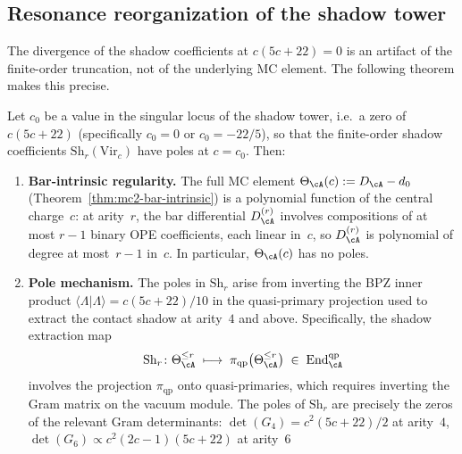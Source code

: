 \subsection{Resonance reorganization of the shadow tower}
\label{subsec:w-resonance-reorganization}

The divergence of the shadow coefficients at $c(5c+22) = 0$ is an
artifact of the finite-order truncation, not of the underlying MC element.
The following theorem makes this precise.

\begin{theorem}
\label{thm:w-resonance-reorganization}
Let $c_0$ be a value in the singular locus of the shadow tower,
i.e.\ a zero of $c(5c+22)$ (specifically $c_0 = 0$ or
$c_0 = -22/5$), so that the finite-order shadow coefficients
$\mathrm{Sh}_r(\mathrm{Vir}_c)$ have poles at $c = c_0$.  Then:
\begin{enumerate}[label=\textup{(\roman*)}]
\item \textbf{Bar-intrinsic regularity.}
  The full MC element $\Theta_\cA(c) := D_\cA - d_0$
  \textup{(}Theorem~\textup{\ref{thm:mc2-bar-intrinsic})} is a
  polynomial function of the central charge~$c$: at arity~$r$,
  the bar differential $D_\cA^{(r)}$ involves compositions of
  at most $r - 1$ binary OPE coefficients, each linear in~$c$,
  so $D_\cA^{(r)}$ is polynomial of degree at most~$r - 1$
  in~$c$.  In particular, $\Theta_\cA(c)$ has no poles.
\item \textbf{Pole mechanism.}
  The poles in $\mathrm{Sh}_r$ arise from inverting the BPZ inner
  product $\langle\Lambda|\Lambda\rangle = c(5c+22)/10$ in the
  quasi-primary projection used to extract the contact shadow at
  arity~$4$ and above.  Specifically, the shadow extraction map
  \begin{equation}\label{eq:shadow-extraction-resonance}
  \mathrm{Sh}_r\colon
  \Theta_\cA^{\leq r}
  \;\longmapsto\;
  \pi_{\mathrm{qp}}\bigl(\Theta_\cA^{\leq r}\bigr)
  \;\in\;
  \operatorname{End}_{\cA}^{\mathrm{qp}}
  \end{equation}
  involves the projection $\pi_{\mathrm{qp}}$ onto quasi-primaries,
  which requires inverting the Gram matrix on the vacuum module.
  The poles of $\mathrm{Sh}_r$ are precisely the zeros of the relevant
  Gram determinants: $\det(G_4) = c^2(5c+22)/2$ at arity~$4$,
  $\det(G_6) \propto c^2(2c-1)(5c+22)$ at arity~$6$

\end{enumerate}
\end{theorem}
